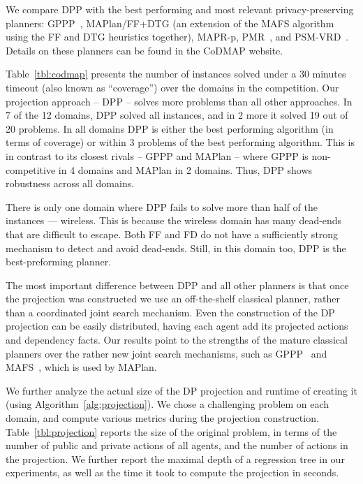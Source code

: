 \documentclass[letterpaper]{article}
\theoremstyle{definition}
\begin{document}
We compare DPP with the best performing and most relevant privacy-preserving planners: GPPP~\cite{maliah2015privacy}, MAPlan/FF+DTG (an extension of the MAFS algorithm~\cite{nissim2014distributed} using the FF and DTG heuristics together), MAPR-p, PMR~\cite{luis2014planMerging}, and PSM-VRD~\cite{tovzivcka2014generating,jakubuv2015multiagent}. Details on these planners can be found in the CoDMAP website.

Table~\ref{tbl:codmap} presents the number of instances solved under a 30 minutes timeout (also known as ``coverage'') over the domains in the competition. Our projection approach -- DPP -- solves more problems than all other approaches. In 7 of the 12 domains, DPP solved all instances, and in 2 more it solved 19 out of 20 problems. In all domains DPP is either the best performing algorithm (in terms of coverage) or within 3 problems of the best performing algorithm. This is in contrast to its closest rivals -- GPPP and MAPlan -- where GPPP is non-competitive in 4 domains and MAPlan in 2 domains. Thus, DPP shows robustness across all domains.


There is only one domain where DPP fails to solve more than half of the instances --- wireless. This is because the wireless domain has many dead-ends that are difficult to escape. Both FF and FD do not have a sufficiently strong mechanism to detect and avoid dead-ends. Still, in this domain too, DPP is the best-preforming planner.

The most important difference between DPP and all other planners is that once the projection was constructed we use an off-the-shelf classical planner, rather than a coordinated joint search mechanism. Even the construction of the DP projection can be easily distributed, having each agent add its projected actions and dependency facts.
Our results point to the strengths of the mature classical planners over the rather new joint search mechanisms, such as GPPP~\cite{maliah2014privacyPreserving} and MAFS~\cite{nissim2014distributed}, which is used by MAPlan.


We further analyze the actual size of the DP projection and runtime of creating it (using Algorithm~\ref{alg:projection}). We chose a challenging problem on each domain, and compute various metrics during the projection construction.  Table~\ref{tbl:projection} reports the size of the original problem, in terms of the number of public and private actions of all agents, and the number of actions in the projection. We further report the maximal depth of a regression tree in our experiments, as well as the time it took to compute the projection in seconds.
\end{document}

